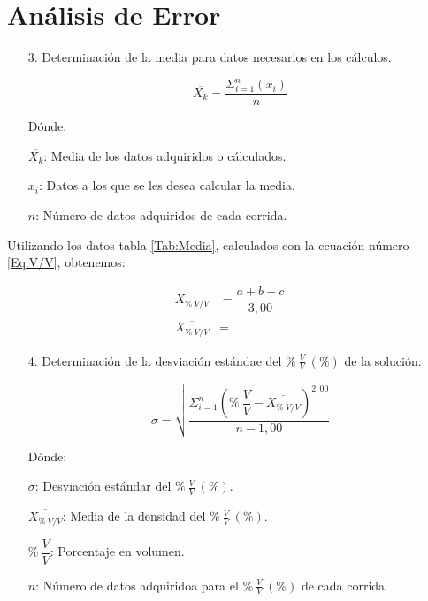 \documentclass[12pt,letterpaper]{article}
\begin{document}

\section{Análisis de Error}




\begin{enumerate}
	\item[3.] Determinación de la media para datos necesarios en los cálculos.
	
\begin{equation}
\overline{X_{k}} = \dfrac{\Sigma_{i=1}^{n} (x_{i})}{n}
\label{Eq:Media}
\end{equation}	

Dónde:\

$\overline{X_{k}}$: Media de los datos adquiridos o cálculados.\

$x_{i}$: Datos a los que se les desea calcular la media.\

$n$: Número de datos adquiridos de cada corrida.
	
\end{enumerate}

Utilizando los datos tabla \ref{Tab:Media}, calculados con la ecuación número \ref{Eq:V/V}, obtenemos:\

\begin{align*}
\overline{X_{\% \ V/V}} &= \dfrac{a+b+c}{3,00}\\
\overline{X_{\% \ V/V}} &=
\end{align*}


\begin{enumerate}
\item[4.] Determinación de la desviación estándae del $\% \ \frac{V}{V} \ (\%)$ de la solución.

\begin{equation}
\sigma = \sqrt{\dfrac{\Sigma_{i=1}^{n}(\% \ \dfrac{V}{V} - \overline{X_{\% \ V/V}})^{2,00}}{n-1,00}}
\label{Eq:Desv}
\end{equation}

Dónde:\

$\sigma$: Desviación estándar del $\% \ \frac{V}{V} \ (\%)$.\

$\overline{X_{\% \ V/V}}$: Media de la densidad del $\% \ \frac{V}{V} \ (\%)$.\

$\% \ \dfrac{V}{V}$: Porcentaje en volumen.\

$n$: Número de datos adquiridoa para el $\% \ \frac{V}{V} \ (\%)$ de cada corrida.

\end{enumerate}
\end{document}
